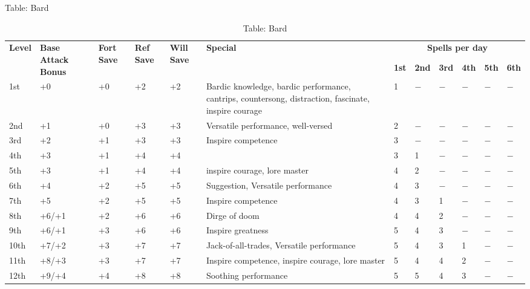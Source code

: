 Table: Bard
\begin{table}[]
\caption{Table: Bard}
\sffamily
\begin{tabularx}{\linewidth}{lp{5em}p{1.5em}p{1.5em}p{1.5em}Xllllll}
\multirow{2}{*}{\textbf{Level}} & \multirow{2}{*}{\parbox{5em}{\textbf{Base Attack Bonus}}} & \multirow{2}{*}{\parbox{1.5em}{\textbf{Fort Save}}} & \multirow{2}{*}{\parbox{1.5em}{\textbf{Ref Save}}} & \multirow{2}{*}{\parbox{1.5em}{\textbf{Will Save}}} & \textbf{Special}                                                                                              & \multicolumn{6}{c}{\textbf{Spells per day}} \\
                       &                                    &                            &                           &                            &                                                                                                      & \textbf{1st}  & \textbf{2nd} & \textbf{3rd} &\textbf{4th} & \textbf{5th} & \textbf{6th} \\
1st & +0 & +0 & +2 & +2 & Bardic knowledge, bardic performance, cantrips, countersong, distraction, fascinate, inspire courage & 1 & $-$ & $-$ & $-$ & $-$ & $-$\\
2nd & +1 & +0 & +3 & +3 & Versatile performance, well-versed & 2 & $-$ & $-$ & $-$ & $-$ & $-$\\
3rd & +2 & +1 & +3 & +3 & Inspire competence & 3 & $-$ & $-$ & $-$ & $-$ & $-$\\
4th & +3 & +1 & +4 & +4 &  & 3 & 1 & $-$ & $-$ & $-$ & $-$\\
5th & +3 & +1 & +4 & +4 & inspire courage, lore master & 4 & 2 & $-$ & $-$ & $-$ & $-$\\
6th & +4 & +2 & +5 & +5 & Suggestion, Versatile performance & 4 & 3 & $-$ & $-$ & $-$ & $-$\\
7th & +5 & +2 & +5 & +5 & Inspire competence & 4 & 3 & 1 & $-$ & $-$ & $-$\\
8th & +6/+1 & +2 & +6 & +6 & Dirge of doom & 4 & 4 & 2 & $-$ & $-$ & $-$\\
9th & +6/+1 & +3 & +6 & +6 & Inspire greatness & 5 & 4 & 3 & $-$ & $-$ & $-$\\
10th & +7/+2 & +3 & +7 & +7 & Jack-of-all-trades, Versatile performance & 5 & 4 & 3 & 1 & $-$ & $-$\\
11th & +8/+3 & +3 & +7 & +7 & Inspire competence, inspire courage, lore master & 5 & 4 & 4 & 2 & $-$ & $-$\\
12th & +9/+4 & +4 & +8 & +8 & Soothing performance & 5 & 5 & 4 & 3 & $-$ & $-$\\

\end{tabularx}
\end{table}
